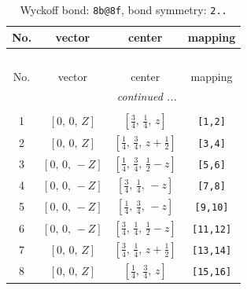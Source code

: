 \documentclass[fleqn,8pt]{jsarticle}
\begin{document}
\renewcommand{\arraystretch}{1.2}
\begin{longtable}{cccc}
\caption{Wyckoff bond: {\tt 8b@8f}, bond symmetry: {\tt 2..}}
 \\
 \hline \hline
No. & vector & center & mapping \\ \hline \endfirsthead

\multicolumn{3}{l}{\tablename\ \thetable{}} \\
 \hline \hline
No. & vector & center & mapping \\ \hline \endhead

 \hline \hline
\multicolumn{3}{r}{\footnotesize\it continued ...} \\ \endfoot

 \hline \hline
\multicolumn{3}{r}{} \\ \endlastfoot

1 & $\left[ 0,\, 0,\, Z \right]$ & $\left[ \frac{3}{4},\, \frac{1}{4},\, z \right]$ & {\tt [1,2]} \\ \hline
2 & $\left[ 0,\, 0,\, Z \right]$ & $\left[ \frac{1}{4},\, \frac{3}{4},\, z + \frac{1}{2} \right]$ & {\tt [3,4]} \\ \hline
3 & $\left[ 0,\, 0,\, - Z \right]$ & $\left[ \frac{1}{4},\, \frac{3}{4},\, \frac{1}{2} - z \right]$ & {\tt [5,6]} \\ \hline
4 & $\left[ 0,\, 0,\, - Z \right]$ & $\left[ \frac{3}{4},\, \frac{1}{4},\, - z \right]$ & {\tt [7,8]} \\ \hline
5 & $\left[ 0,\, 0,\, - Z \right]$ & $\left[ \frac{1}{4},\, \frac{3}{4},\, - z \right]$ & {\tt [9,10]} \\ \hline
6 & $\left[ 0,\, 0,\, - Z \right]$ & $\left[ \frac{3}{4},\, \frac{1}{4},\, \frac{1}{2} - z \right]$ & {\tt [11,12]} \\ \hline
7 & $\left[ 0,\, 0,\, Z \right]$ & $\left[ \frac{3}{4},\, \frac{1}{4},\, z + \frac{1}{2} \right]$ & {\tt [13,14]} \\ \hline
8 & $\left[ 0,\, 0,\, Z \right]$ & $\left[ \frac{1}{4},\, \frac{3}{4},\, z \right]$ & {\tt [15,16]} \\
\end{longtable}
\renewcommand{\arraystretch}{1.2}
\end{document}
